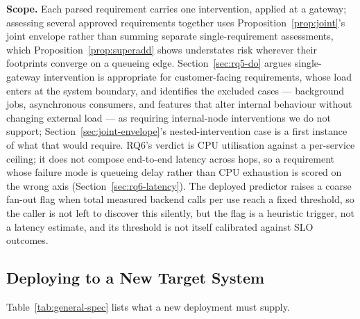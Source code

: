 \documentclass[journal, 10pt]{IEEEtran}
\begin{document}
\textbf{Scope.} Each parsed requirement carries one intervention, applied at a
gateway; assessing several approved requirements together uses
Proposition~\ref{prop:joint}'s joint envelope rather than summing separate
single-requirement assessments, which Proposition~\ref{prop:superadd} shows
understates risk wherever their footprints converge on a queueing edge.
Section~\ref{sec:rq5-do} argues single-gateway intervention is appropriate for
customer-facing requirements, whose load enters at the system boundary, and
identifies the excluded cases --- background jobs, asynchronous consumers, and
features that alter internal behaviour without changing external load --- as
requiring internal-node interventions we do not support; Section~\ref{sec:joint-envelope}'s
nested-intervention case is a first instance of what that would require. RQ6's
verdict is CPU utilisation against a per-service ceiling; it does not compose
end-to-end latency across hops, so a requirement whose failure mode is queueing
delay rather than CPU exhaustion is scored on the wrong axis
(Section~\ref{sec:rq6-latency}). The deployed predictor raises a coarse
fan-out flag when total measured backend calls per use reach a fixed
threshold, so the caller is not left to discover this silently, but the flag
is a heuristic trigger, not a latency estimate, and its threshold is not
itself calibrated against SLO outcomes.


\subsection{Deploying to a New Target System}
\label{sec:general-spec}
Table~\ref{tab:general-spec} lists what a new deployment must supply.
\end{document}
